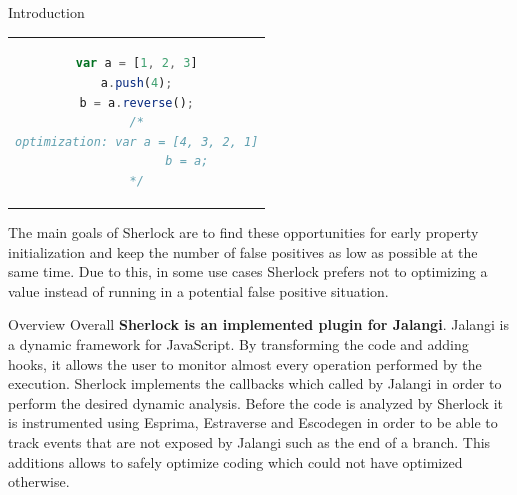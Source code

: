 \documentclass[a1paper,portrait,fontscale=0.418]{baposter}
\begin{document}
\begin{poster}
\begin{posterbox}[name=introduction,column=0,row=0]{Introduction}
\begin{center}
\begin{tabular}{|c}
\begin{lstlisting}[language=Javascript]
var a = [1, 2, 3]
a.push(4);
b = a.reverse();
/*
optimization: var a = [4, 3, 2, 1]
              b = a;
*/

\end{lstlisting}

\end{tabular}
\label{list1}
\end{center}

The main goals of Sherlock are to find these opportunities for early property initialization and keep the number of false positives as low as possible at the same time. Due to this, in some use cases Sherlock prefers not to optimizing a value instead of running in a potential false positive situation.
\end{posterbox}

\begin{posterbox}[name=methods,column=0,below=introduction]{Overview}
Overall \textbf{Sherlock is an implemented plugin for Jalangi}. Jalangi is a dynamic framework for JavaScript. By transforming the code and adding hooks, it allows the user to monitor almost every operation performed by the execution. Sherlock implements the callbacks which called by Jalangi in order to perform the desired dynamic analysis. Before the code is analyzed by Sherlock it is instrumented using Esprima, Estraverse and Escodegen in order to be able to track events that are not exposed by Jalangi such as the end of a branch. This additions allows to safely optimize coding which could not have optimized otherwise.

\begin{center}
\end{center}
\end{posterbox}
\end{poster}
\end{document}
